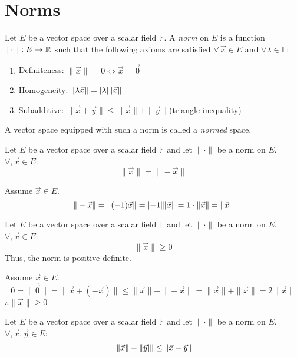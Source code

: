 \documentclass[letterpaper,12pt,fleqn]{article}
\renewcommand{\l}{\lambda}
\newcommand{\F}{\mathbb{F}}
\newcommand{\norm}[1]{\|#1\|}
\newcommand{\vx}{\vec{x}}
\newcommand{\vy}{\vec{y}}
\newcommand{\vo}{\vec{0}}
\begin{document}
\section*{Norms}

\begin{definition}[Norm]
  Let $E$ be a vector space over a scalar field $\F$. A \emph{norm} on $E$ is a
  function $\norm{\cdot}:E\to\R$ such that the following axioms are satisfied
  $\forall\,\vx\in E$ and $\forall\l\in\F$:
  \begin{enumerate}
  \item Definiteness: $\norm{\vx}=0\iff\vx=\vo$
  \item Homogeneity: $\norm{\l\vx}=\abs{\l}\norm{\vx}$
  \item Subadditive: $\norm{\vx+\vy}\le\norm{\vx}+\norm{\vy}$\qquad(triangle
    inequality)
  \end{enumerate}
  A vector space equipped with such a norm is called a \emph{normed} space.
\end{definition}

\begin{theorem}
  Let $E$ be a vector space over a scalar field $\F$ and let $\norm{\cdot}$ be
  a norm on $E$. $\forall,\vx\in E$:
  \[\norm{\vx}=\norm{-\vx}\]
\end{theorem}

\begin{theproof}
  Assume $\vx\in E$.
  \[\norm{-\vx}=\norm{(-1)\vx}=\abs{-1}\norm{\vx}=1\cdot\norm{\vx}=\norm{\vx}\]
\end{theproof}

\begin{theorem}
  Let $E$ be a vector space over a scalar field $\F$ and let $\norm{\cdot}$ be
  a norm on $E$. $\forall,\vx\in E$:
  \[\norm{\vx}\ge0\]
  Thus, the norm is positive-definite.
\end{theorem}

\begin{theproof}
  Assume $\vx\in E$.
  \[0=\norm{\vo}=\norm{\vx+(-\vx)}\le\norm{\vx}+\norm{-\vx}=
  \norm{\vx}+\norm{\vx}=2\norm{\vx}\]
  $\therefore\norm{\vx}\ge0$
\end{theproof}

\begin{theorem}
  Let $E$ be a vector space over a scalar field $\F$ and let $\norm{\cdot}$ be
  a norm on $E$. $\forall,\vx,\vy\in E$:
  \[\abs{\norm{\vx}-\norm{\vy}}\le\norm{\vx-\vy}\]
\end{theorem}

\newpage
\end{document}
